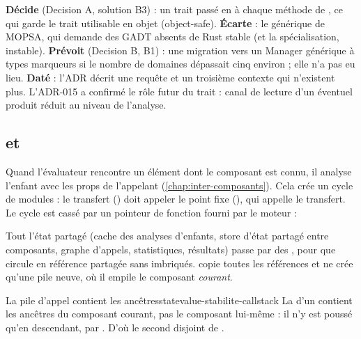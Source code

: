 \begin{decision}
\textbf{Décide} (\og Decision A\fg{}, solution B3) : un trait
 passé en  à chaque méthode de
, ce qui garde le trait utilisable en objet (object-safe).
\textbf{Écarte} : le  générique de MOPSA, qui demande des GADT
absents de Rust stable (et la spécialisation, instable). \textbf{Prévoit}
(\og Decision B\fg{}, B1) : une migration vers un \og Manager\fg{} générique à
types marqueurs si le nombre de domaines dépassait cinq environ ; elle n'a
pas eu lieu. \textbf{Daté} : l'ADR décrit une requête 
et un troisième contexte  qui n'existent plus. L'ADR-015
a confirmé le rôle futur du trait : canal de lecture d'un éventuel produit
réduit au niveau de l'analyse.
\end{decision}

\subsection{ et }

Quand l'évaluateur rencontre un élément  dont le composant
est connu, il analyse l'enfant avec les props de l'appelant
(\cref{chap:inter-composants}). Cela crée un cycle de modules : le transfert
() doit appeler le point fixe (), qui appelle le
transfert. Le cycle est cassé par un pointeur de fonction fourni par le
moteur :



Tout l'état partagé (cache des analyses d'enfants, store d'état partagé
entre composants, graphe d'appels, statistiques, résultats) passe par des
, pour que  circule en référence partagée sans
 imbriqués.  copie toutes les références et ne crée
qu'une pile neuve, où il empile le composant \emph{courant}.

\begin{invariant}{La pile d'appel contient les ancêtres}{statevalue-stabilite-callstack}
  La  d'un  contient les ancêtres du
  composant courant, pas le composant lui-même : il n'y est poussé qu'en
  descendant, par . D'où le second disjoint
   de .
\end{invariant}

